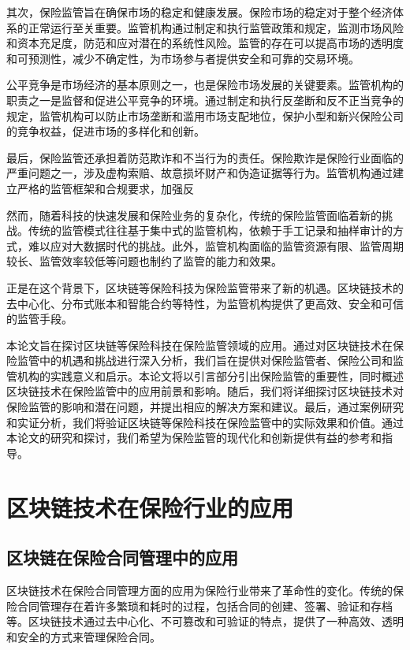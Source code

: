 \documentclass[a4paper,12pt]{ctexart}
\begin{document}
其次，保险监管旨在确保市场的稳定和健康发展。保险市场的稳定对于整个经济体系的正常运行至关重要。监管机构通过制定和执行监管政策和规定，监测市场风险和资本充足度，防范和应对潜在的系统性风险。监管的存在可以提高市场的透明度和可预测性，减少不确定性，为市场参与者提供安全和可靠的交易环境。

公平竞争是市场经济的基本原则之一，也是保险市场发展的关键要素。监管机构的职责之一是监督和促进公平竞争的环境。通过制定和执行反垄断和反不正当竞争的规定，监管机构可以防止市场垄断和滥用市场支配地位，保护小型和新兴保险公司的竞争权益，促进市场的多样化和创新。

最后，保险监管还承担着防范欺诈和不当行为的责任。保险欺诈是保险行业面临的严重问题之一，涉及虚构索赔、故意损坏财产和伪造证据等行为。监管机构通过建立严格的监管框架和合规要求，加强反

然而，随着科技的快速发展和保险业务的复杂化，传统的保险监管面临着新的挑战。传统的监管模式往往基于集中式的监管机构，依赖于手工记录和抽样审计的方式，难以应对大数据时代的挑战。此外，监管机构面临的监管资源有限、监管周期较长、监管效率较低等问题也制约了监管的能力和效果。

正是在这个背景下，区块链等保险科技为保险监管带来了新的机遇。区块链技术的去中心化、分布式账本和智能合约等特性，为监管机构提供了更高效、安全和可信的监管手段。

本论文旨在探讨区块链等保险科技在保险监管领域的应用。通过对区块链技术在保险监管中的机遇和挑战进行深入分析，我们旨在提供对保险监管者、保险公司和监管机构的实践意义和启示。本论文将以引言部分引出保险监管的重要性，同时概述区块链技术在保险监管中的应用前景和影响。随后，我们将详细探讨区块链技术对保险监管的影响和潜在问题，并提出相应的解决方案和建议。最后，通过案例研究和实证分析，我们将验证区块链等保险科技在保险监管中的实际效果和价值。通过本论文的研究和探讨，我们希望为保险监管的现代化和创新提供有益的参考和指导。

\section{区块链技术在保险行业的应用}
\subsection{区块链在保险合同管理中的应用}

区块链技术在保险合同管理方面的应用为保险行业带来了革命性的变化。传统的保险合同管理存在着许多繁琐和耗时的过程，包括合同的创建、签署、验证和存档等。区块链技术通过去中心化、不可篡改和可验证的特点，提供了一种高效、透明和安全的方式来管理保险合同。
\end{document}

